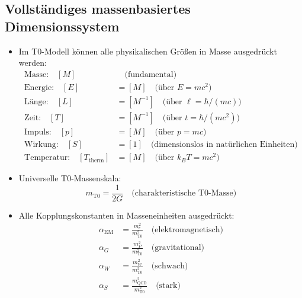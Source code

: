\documentclass[12pt,a4paper]{article}
\begin{document}
\subsection{Vollständiges massenbasiertes Dimensionssystem}
\begin{itemize}
	\item Im T0-Modell können alle physikalischen Größen in Masse ausgedrückt werden:
	\begin{align}
		\text{Masse:} \quad [M] &\quad \text{(fundamental)} \\
		\text{Energie:} \quad [E] &= [M] \quad \text{(über } E = mc^2 \text{)} \\
		\text{Länge:} \quad [L] &= [M^{-1}] \quad \text{(über } \ell = \hbar/(mc) \text{)} \\
		\text{Zeit:} \quad [T] &= [M^{-1}] \quad \text{(über } t = \hbar/(mc^2) \text{)} \\
		\text{Impuls:} \quad [p] &= [M] \quad \text{(über } p = mc \text{)} \\
		\text{Wirkung:} \quad [S] &= [1] \quad \text{(dimensionslos in natürlichen Einheiten)} \\
		\text{Temperatur:} \quad [T_{\text{therm}}] &= [M] \quad \text{(über } k_B T = mc^2 \text{)}
	\end{align}
	
	\item Universelle T0-Massenskala:
	\begin{equation}
		m_{\text{T0}} = \frac{1}{2G} \quad \text{(charakteristische T0-Masse)}
	\end{equation}
	
	\item Alle Kopplungskonstanten in Masseneinheiten ausgedrückt:
	\begin{align}
		\alpha_{\text{EM}} &= \frac{m_e^2}{m_{\text{T0}}^2} \quad \text{(elektromagnetisch)} \\
		\alpha_G &= \frac{m_P^2}{m_{\text{T0}}^2} \quad \text{(gravitational)} \\
		\alpha_W &= \frac{m_W^2}{m_{\text{T0}}^2} \quad \text{(schwach)} \\
		\alpha_S &= \frac{m_{\text{QCD}}^2}{m_{\text{T0}}^2} \quad \text{(stark)}
	\end{align}
\end{itemize}
\end{document}
